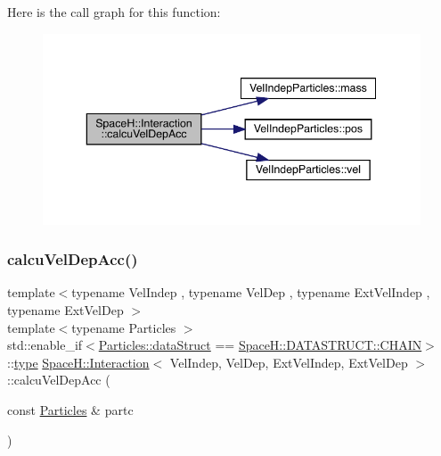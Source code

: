 Here is the call graph for this function\+:\nopagebreak
\begin{figure}[H]
\begin{center}
\leavevmode
\includegraphics[width=343pt]{class_space_h_1_1_interaction_aa7aa7148a435c420e86821ae319e68b0_cgraph}
\end{center}
\end{figure}
\mbox{\label{class_space_h_1_1_interaction_a738430ac153d28064f0068c338cf061f}} 
\subsubsection{\texorpdfstring{calcu\+Vel\+Dep\+Acc()}{calcuVelDepAcc()}\hspace{0.1cm}{\footnotesize\ttfamily [2/2]}}
{\footnotesize\ttfamily template$<$typename Vel\+Indep , typename Vel\+Dep , typename Ext\+Vel\+Indep , typename Ext\+Vel\+Dep $>$ \\
template$<$typename Particles $>$ \\
std\+::enable\+\_\+if$<$\mbox{\hyperlink{class_vel_indep_particles_a6d357b21c216a2b079b1927c18de0b8f}{Particles\+::data\+Struct}} == \mbox{\hyperlink{namespace_space_h_a0af19f79a6498e99dbda772053d44a72a014d2cf3cdc3af6f4f92c09190860e33}{Space\+H\+::\+D\+A\+T\+A\+S\+T\+R\+U\+C\+T\+::\+C\+H\+A\+IN}}$>$\+::\mbox{\hyperlink{class_space_h_1_1_interaction_a0bed18b8b8efcb42be264a255f931be6}{type}} \mbox{\hyperlink{class_space_h_1_1_interaction}{Space\+H\+::\+Interaction}}$<$ Vel\+Indep, Vel\+Dep, Ext\+Vel\+Indep, Ext\+Vel\+Dep $>$\+::calcu\+Vel\+Dep\+Acc (\begin{DoxyParamCaption}\item[{const \mbox{\hyperlink{struct_particles}{Particles}} \&}]{partc }\end{DoxyParamCaption})\hspace{0.3cm}{\ttfamily [inline]}}



